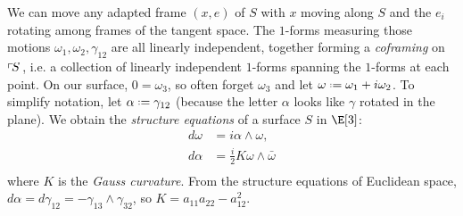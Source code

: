 We can move any adapted frame \((x,e)\) of \(S\) with \(x\) moving along \(S\) and the \(e_i\) rotating among frames of the tangent space.
The \(1\)-forms measuring those motions \(\omega_1, \omega_2, \gamma_{12}\) are all linearly independent, together forming a \emph{coframing} on \(\left\ulcorner\!S\right.\), i.e. a collection of linearly independent \(1\)-forms spanning the \(1\)-forms at each point.
On our surface, \(0=\omega_3\), so often forget \(\omega_3\) and let \(\omega\defeq\omega_1+i\omega_2\).
To simplify notation, let \(\alpha\defeq\gamma_{12}\) (because the letter \(\alpha\) looks like \(\gamma\) rotated in the plane).
We obtain the \emph{structure equations} of a surface \(S\) in \(\E[3]\):
\begin{align*}
d\omega&=i\alpha\wedge\omega,\\
d\alpha &= \frac{i}{2}K\omega\wedge\bar\omega\\
\end{align*}
where \(K\) is the \emph{Gauss curvature}.
From the structure equations of Euclidean space, 
\(d\alpha=d\gamma_{12} = -\gamma_{13}\wedge\gamma_{32}\), so 
\(K=a_{11}a_{22}-a_{12}^2\).

